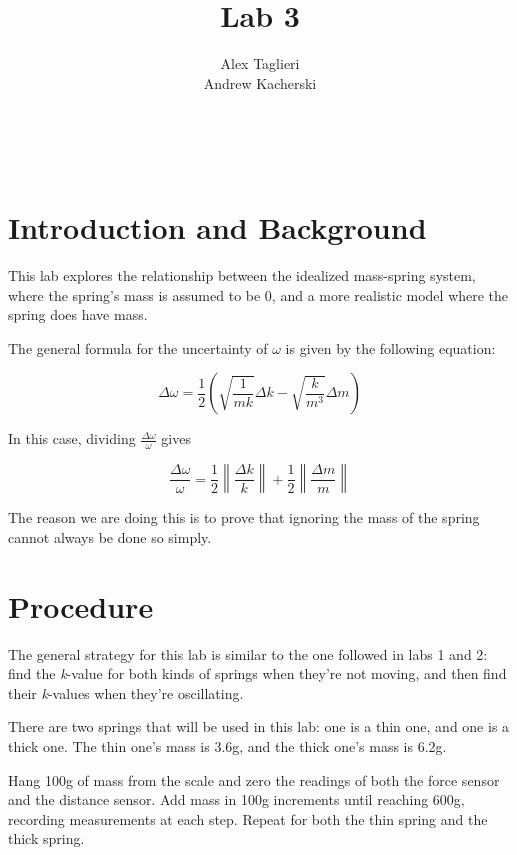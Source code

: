\documentclass[]{article}
\title{Lab 3}
\author{
	Alex Taglieri
	\\
	Andrew Kacherski
	}
\begin{document}
\maketitle
\newpage
\
\raggedright


\section{Introduction and Background}

This lab explores the relationship between the idealized mass-spring system, where the spring's mass is assumed to be 0, and a more realistic model where the spring does have mass.

The general formula for the uncertainty of $ \omega $ is given by the following equation:


\begin{equation}\label{uncertaintyLong}
\Delta \omega = \frac{1}{2}(\sqrt{\frac{1}{mk}}\Delta k - \sqrt{\frac{k}{m^3}}\Delta m)
\end{equation}

In this case, dividing $ \frac{\Delta \omega}{\omega} $ gives

\begin{equation}\label{uncertainty}
\frac{\Delta \omega}{\omega} = \frac{1}{2} \left\| \frac{\Delta k}{k} \right\|+ \frac{1}{2} \left\|\frac{\Delta m}{m} \right\|
\end{equation}


The reason we are doing this is to prove that ignoring the mass of the spring cannot always be done so simply. 

\section{Procedure}

The general strategy for this lab is similar to the one followed in labs 1 and 2: find the \textit{k}-value for both kinds of springs when they're not moving, and then find their \textit{k}-values when they're oscillating.

There are two springs that will be used in this lab: one is a thin one, and one is a thick one. The thin one's mass is 3.6g, and the thick one's mass is 6.2g.

Hang 100g of mass from the scale and zero the readings of both the force sensor and the distance sensor. Add mass in 100g increments until reaching 600g, recording measurements at each step. Repeat for both the thin spring and the thick spring.
\end{document}
